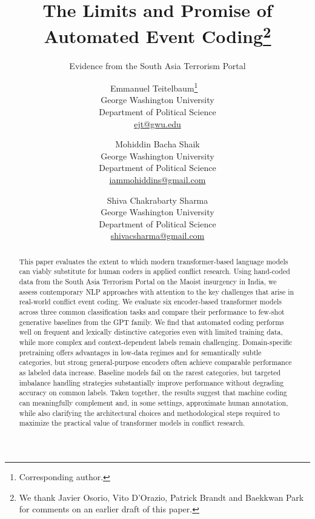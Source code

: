 \documentclass[
  11pt,
]{article}
\title{The Limits and Promise of Automated Event Coding\thanks{We thank
Javier Osorio, Vito D'Orazio, Patrick Brandt and Baekkwan Park for
comments on an earlier draft of this paper.}}
\subtitle{Evidence from the South Asia Terrorism Portal}
\author{Emmanuel Teitelbaum\thanks{Corresponding author.}
~\orcidlink{0000-0001-7089-0588m}
\\George Washington University
\\Department of Political Science
\\\href{mailto:ejt@gwu.edu}{ejt@gwu.edu}
 \and Mohiddin Bacha Shaik
\\George Washington University
\\Department of Political Science
\\\href{mailto:iammohiddins@gmail.com}{iammohiddins@gmail.com}
 \and Shiva Chakrabarty Sharma
\\George Washington University
\\Department of Political Science
\\\href{mailto:shivacsharma@gmail.com}{shivacsharma@gmail.com}
 }
\date{}  %
\newcommand{\published}[1]{%
   \gdef\puB{#1}}
\newcommand{\puB}{}
\begin{document}


\published{\textbf{2026-01-31} \qquad Prepared for the GWU Comparative
Politics Workshop. \\ {\scriptsize Access the code, data, and analysis
at \url{https://github.com/eteitelbaum/code-satp.git}}}

\vspace{0.25in}

\maketitle

\vspace{0.25in}


\begin{abstract}
\noindent            %
This paper evaluates the extent to which modern transformer-based
language models can viably substitute for human coders in applied
conflict research. Using hand-coded data from the South Asia Terrorism
Portal on the Maoist insurgency in India, we assess contemporary NLP
approaches with attention to the key challenges that arise in real-world
conflict event coding. We evaluate six encoder-based transformer models
across three common classification tasks and compare their performance
to few-shot generative baselines from the GPT family. We find that
automated coding performs well on frequent and lexically distinctive
categories even with limited training data, while more complex and
context-dependent labels remain challenging. Domain-specific pretraining
offers advantages in low-data regimes and for semantically subtle
categories, but strong general-purpose encoders often achieve comparable
performance as labeled data increase. Baseline models fail on the rarest
categories, but targeted imbalance handling strategies substantially
improve performance without degrading accuracy on common labels. Taken
together, the results suggest that machine coding can meaningfully
complement and, in some settings, approximate human annotation, while
also clarifying the architectural choices and methodological steps
required to maximize the practical value of transformer models in
conflict research.
\end{abstract}

\vspace{\baselineskip}
\end{document}
